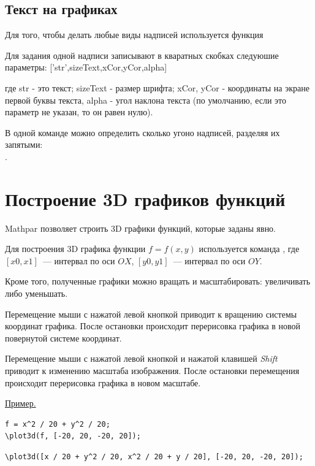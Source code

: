 \subsection{Текст на графиках}
Для того, чтобы делать любые виды надписей используется функция

Для задания одной надписи записывают в кваратных скобках
следуюшие параметры: ['str',sizeText,xCor,yCor,alpha]

  где str - это текст; sizeText - размер шрифта; xCor, yCor - координаты на экране первой буквы текста,
  alpha - угол наклона текста  (по умолчанию, если это параметр не указан, то он равен нулю). 

В одной команде можно определить сколько угоно надписей, разделяя их запятыми:\\
  .

\section{Построение 3D графиков функций}
 Mathpar позволяет строить 3D графики функций, которые заданы явно. 
 
 Для построения 3D графика функции $f=f(x, y)$ используется команда 
,
 где $[x0, x1]$~--- интервал по оси $OX$,  $[y0, y1]$~--- интервал по оси $OY$. 
 
Кроме того,  полученные графики можно вращать и масштабировать: увеличивать либо уменьшать. 

 Перемещение мыши с нажатой левой кнопкой приводит к вращению системы координат графика. 
 После остановки происходит перерисовка графика в новой повернутой системе координат. 
 
 Перемещение мыши с нажатой левой кнопкой и нажатой клавишей {\it Shift} приводит к изменению масштаба изображения. 
 После остановки перемещения происходит перерисовка графика в новом масштабе.  

\underline{Пример. }

\vspace*{-2mm}

\begin{verbatim}
f = x^2 / 20 + y^2 / 20;
\plot3d(f, [-20, 20, -20, 20]);
\end{verbatim}

\begin{verbatim}
\plot3d([x / 20 + y^2 / 20, x^2 / 20 + y / 20], [-20, 20, -20, 20]);
\end{verbatim}

